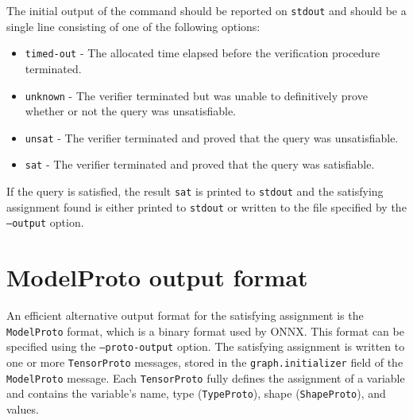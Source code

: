 


\noindent The initial output of the command should be reported on \texttt{stdout} and should be a single line consisting of one of the following options: 
\begin{itemize}
\item \texttt{timed-out} - The allocated time elapsed before the verification procedure terminated.
\item \texttt{unknown} - The verifier terminated but was unable to definitively prove whether or not the query was unsatisfiable.
\item \texttt{unsat} - The verifier terminated and proved that the query was unsatisfiable.
\item \texttt{sat} - The verifier terminated and proved that the query was satisfiable.
\end{itemize}
If the query is satisfied, the result \texttt{sat} is printed to \texttt{stdout} and the satisfying assignment found is either printed to \texttt{stdout} or written to the file specified by the \texttt{--output} option. 

\section*{ModelProto output format}
An efficient alternative output format for the satisfying assignment is the \texttt{ModelProto} format, which is a binary format used by ONNX. This format can be specified using the \texttt{--proto-output} option. The satisfying assignment is written to one or more \texttt{TensorProto} messages, stored in the \texttt{graph.initializer} field of the \texttt{ModelProto} message. Each \texttt{TensorProto} fully defines the assignment of a variable and contains the variable's name, type (\texttt{TypeProto}), shape (\texttt{ShapeProto}), and values.

